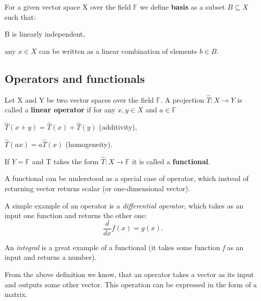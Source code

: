 \begin{definition}
For a given vector space X over the field $\mathbb{F}$ we define \textbf{basis} as a subset $B \subseteq X$ such that:
\begin{legal}
    \item B is linearly independent,
    \item any $x \in X$ can be written as a linear combination of elements $b \in B$.
\end{legal}
\end{definition}

\subsection{Operators and functionals}

\begin{definition}
Let X and Y be two vector spaces over the field $\mathbb{F}$. A projection $\hat{T}: X \rightarrow Y$ is called a \textbf{linear operator} if for any $x,y \in X$ and $a \in \mathbb{F}$
\begin{legal}
    \item $\hat{T}(x + y) = \hat{T}(x) + \hat{T}(y)$ (additivity),
    \item $\hat{T}(ax) = a\hat{T}(x)$ (homogeneity).
\end{legal}
If $Y = \mathbb{F}$ and T takes the form $\hat{T}: X \rightarrow \mathbb{F}$ it is called a \textbf{functional}.
\end{definition}

\begin{remark}
A functional can be understood as a special case of operator, which instead of returning vector returns scalar (or one-dimensional vector).
\end{remark}

\begin{example}
A simple example of an operator is a \textit{differential operator}, which takes as an input one function and returns the other one:
\[ \frac{d}{dx} f(x) = g(x). \]
\end{example}

\begin{example}
An \textit{integral} is a great example of a functional (it takes some function \textit{f} as an input and returns a number).
\end{example}

From the above definition we know, that an operator takes a vector as its input and outputs some other vector. This operation can be expressed in the form of a matrix.

